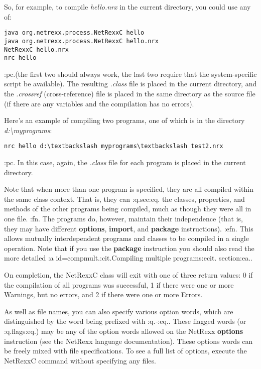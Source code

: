 So, for example, to compile \emph{hello.nrx} in the current directory,
you could use any of:
\begin{verbatim}
java org.netrexx.process.NetRexxC hello
java org.netrexx.process.NetRexxC hello.nrx
NetRexxC hello.nrx
nrc hello
\end{verbatim}
:pc.(the first two should always work, the last two require that the
system-specific script be available).  The resulting \emph{.class} file
is placed in the current directory, and the \emph{.crossref}
(cross-reference) file is placed in the same directory as the source
file (if there are any variables and the compilation has no errors).

Here's an example of compiling two programs, one of which is in the
directory \emph{d:\textbackslash myprograms}:
\begin{verbatim}
nrc hello d:\textbackslash myprograms\textbackslash test2.nrx
\end{verbatim}
:pc.
In this case, again, the \emph{.class} file for each program is placed
in the current directory.

Note that when more than one program is specified, they are all compiled
within the same class context.  That is, they can :q.see:eq. the
classes, properties, and methods of the other programs being compiled,
much as though they were all in one file.
:fn.
The programs do, however, maintain their independence (that is, they may
have different \textbf{options}, \textbf{import}, and \textbf{package}
instructions).
:efn.
This allows mutually interdependent programs and classes to be compiled
in a single operation.
Note that if you use the \textbf{package} instruction you should also
read the more detailed :a id=compmult.:cit.Compiling multiple
programs:ecit. section:ea..

On completion, the NetRexxC class will exit with one of three return
values: 0 if the compilation of all programs was successful, 1 if there
were one or more Warnings, but no errors, and 2 if there were one or
more Errors.

As well as file names, you can also specify various option words, which
are distinguished by the word being prefixed with :q.\emph{-}:eq..  These
flagged words (or :q.flags:eq.) may be any of the option words allowed
on the NetRexx \textbf{options} instruction (see the NetRexx language
documentation).  These options words can be freely mixed with file
specifications.  To see a full list of options, execute the NetRexxC
command without specifying any files.

